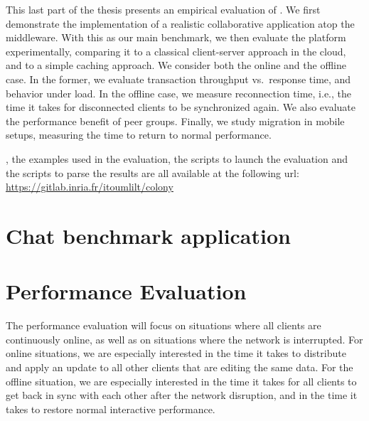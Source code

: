 

This last part of the thesis presents an empirical evaluation of \system.
We first demonstrate the implementation of a realistic collaborative application
atop the middleware.
With this as our main benchmark, we then evaluate the platform
experimentally, comparing it to a classical client-server approach in
the cloud, and to a simple caching approach.
We consider both the online and the offline case.
In the former, we evaluate transaction throughput vs.~response time, and
behavior under load.
In the offline case, we measure reconnection
time, i.e., the time it takes for disconnected clients to be
synchronized again.
We also evaluate the performance benefit of peer groups.
Finally, we study migration in mobile setups, measuring
the time to return to normal performance.

\begin{notice}
    \system{}, the examples used in the evaluation, the scripts to launch
    the evaluation and the scripts to parse the results are all available at the following
    url: \url{https://gitlab.inria.fr/itoumlilt/colony}
\end{notice}


\chapter{\system{}Chat benchmark application}
\label{ch:eval:benchmark-app}


\chapter{Performance Evaluation}

The performance evaluation will focus on situations where all clients are 
continuously online, 
as well as on situations where the network is interrupted. 
For online situations, 
we are especially interested in the time it takes to distribute and apply an 
update to all other clients that are editing the same data. 
For the offline situation, 
we are especially interested in the time it takes for all clients to get back 
in sync with each other after the network disruption, 
and in the time it takes to restore normal interactive performance.

